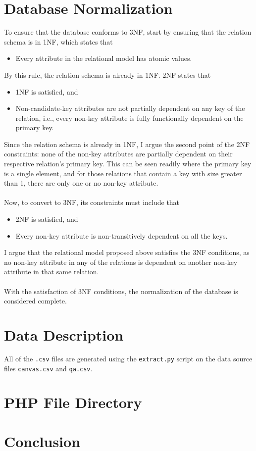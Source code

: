 \documentclass{paper}
\begin{document}
	\section{Database Normalization}
	To ensure that the database conforms to 3NF, start by ensuring that the relation schema is in 1NF, which states that
	\begin{itemize}
		\item Every attribute in the relational model has atomic values.
	\end{itemize}
	By this rule, the relation schema is already in 1NF. 2NF states that
	\begin{itemize}
		\item 1NF is satisfied, and
		\item Non-candidate-key attributes are not partially dependent on any key of the relation, i.e., every non-key attribute is fully functionally dependent on the primary key.
	\end{itemize}
	Since the relation schema is already in 1NF, I argue the second point of the 2NF constraints: none of the non-key attributes are partially dependent on their respective relation's primary key. This can be seen readily where the primary key is a single element, and for those relations that contain a key with  size greater than 1, there are only one or no non-key attribute.\\\\
	Now, to convert to 3NF, its constraints must include that
	\begin{itemize}
		\item 2NF is satisfied, and
		\item Every non-key attribute is non-transitively dependent on all the keys.
	\end{itemize}
	I argue that the relational model proposed above satisfies the 3NF conditions, as no non-key attribute in any of the relations is dependent on another non-key attribute in that same relation.\\\\
	With the satisfaction of 3NF conditions, the normalization of the database is considered complete.
	
	\section{Data Description}
	All of the \verb|.csv| files are generated using the \verb|extract.py| script on the data source files \verb|canvas.csv| and \verb|qa.csv|.
	
	\section{PHP File Directory}
	
	\section{Conclusion}
	
	\clearpage
	
\end{document}
